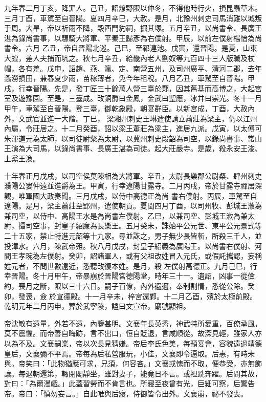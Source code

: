 \begin{pinyinscope}
 九年春二月丁亥，降罪人。己丑，詔燎野限以仲冬，不得他時行火，損昆蟲草木。三月丁酉，車駕至自晉陽。夏四月辛巳，大赦。是月，北豫州刺史司馬消難以城叛于周。大旱，帝以祈雨不降，毀西門豹祠，掘其塚。五月辛丑，以尚書令、長廣王湛為錄尚書事，以驃騎大將軍、平秦王歸彥為右僕射。甲辰，以前左僕射楊愔為尚書令。六月
 乙丑，帝自晉陽北巡。己巳，至祁連池。戊寅，還晉陽。是夏，山東大蝗，差人夫捕而坑之。秋七月辛丑，給畿內老人劉奴等九百四十三人版職及杖帽，各有差。戊申，詔趙、燕、瀛、定、南營五州，及司州廣平、清河二郡，去年螽澇損田，兼春夏少雨，苗稼薄者，免今年租稅。八月乙丑，車駕至自晉陽。甲戌，行幸晉陽。先是，發丁匠三十餘萬人營三臺於鄴，因其舊基而高博之，大起宮室及遊豫園。至是，三臺成。改銅爵曰金鳳，金武曰聖應，冰井曰崇光。冬十一月甲午，車駕至自晉陽。登三臺，御乾象殿，朝宴群臣。以新宮成，丁酉，大赦內外，文武官並進一大階。丁巳，
 梁湘州刺史王琳遣使請立蕭莊為梁主，仍以江州內屬，令莊居之。十二月癸酉，詔以梁王蕭莊為梁主，進居九派。戊寅，以太傅可朱渾道元為太師，以司徒尉粲為太尉，以冀州刺史段韶為司空，以錄尚書事、常山王演為大司馬，以錄尚書事、長廣王湛為司徒。起大莊嚴寺。是歲，殺永安王浚、上黨王渙。



 十年春正月戊戌，以司空侯莫陳相為大將軍。辛丑，太尉長樂郡公尉粲、肆州刺史濮陽公婁仲遠並進爵為王。甲寅，行幸遼陽甘露寺。二月丙戌，帝於甘露寺禪居深觀，唯軍國大政奏聞。三月戊戌，以侍中高德正為尚
 書右僕射。丙辰，車駕至自遼陽。是月，梁主蕭莊至郢州，遣使朝貢。夏閏四月丁酉，以司州牧、彭城王浟為兼司空，以侍中、高陽王水是為尚書左僕射。乙巳，以兼司空、彭城王浟為兼太尉，攝司空事，封皇子紹廉為長樂王。五月癸未，誅始平公元世、東平公元景式等二十五家，禁止特進元韶等十九家。尋並誅之，男子無少長皆斬，所殺三千人，並投漳水。六月，陳武帝殂。秋八月戊戌，封皇子紹義為廣陽王。以尚書右僕射、河間王孝琬為左僕射。癸卯，詔諸軍人，或有父祖改姓冒入元氏，或假託攜認，妄稱姓元者，不問世數遠近，悉聽改復本姓。是月，殺
 左僕射高德正。九月己巳，行幸晉陽。冬十月甲午，帝暴崩於晉陽宮德陽堂，時年三十一。遺詔，凶事一從儉約，喪月之斷，限以三十六日。嗣子百僚，內外遐邇，奉制割情，悉從公除。癸卯，發喪，僉於宣德殿。十一月辛未，梓宮還鄴。十二月乙酉，殯於太極前殿。乾明元年二月丙申，葬於武寧陵，謚曰文宣帝，廟號顯祖。



 帝沈敏有遠量，外若不遠，內鑒甚明。文襄年長英秀，神武特所愛重，百僚承風，莫不震懼。而帝善自晦跡，言不出口，恒自貶退，言咸順從。故深見輕，雖家人亦以為不及。文襄嗣業，帝以次長見猜嫌。帝后李氏色美，每預宴會，容貌遠過靖德
 皇后，文襄彌不平焉。帝每為后私營服玩，小佳，文襄即令逼取。后恚，有時未與。帝笑曰：「此物猶應可求，兄須，何容吝。」文襄或愧而不取，便恭受，亦無飾讓。每退朝還第，輙閉閣靜坐，雖對妻子，能竟日不言。或袒跣奔躍。后問其故，對曰：「為爾漫戲。」此蓋習勞而不肯言也。所寢至夜曾有光，巨細可察，后驚告帝。帝曰：「慎勿妄言。」自此唯與后寢，侍御皆令出外。文襄崩，祕不發喪。




\end{pinyinscope}
